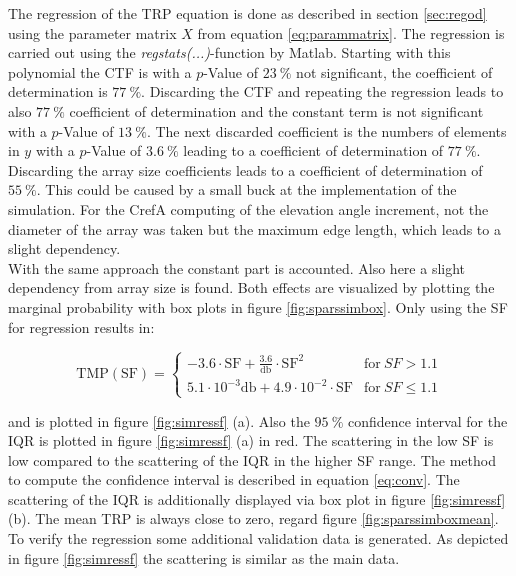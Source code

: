 The regression of the \ac{TRP} equation is done as described in section \ref{sec:regod} using the parameter matrix $X$ from equation \ref{eq:parammatrix}. The regression is carried out using the \textit{regstats(...)}-function by Matlab\texttrademark{}. Starting with this polynomial the \ac{CTF} is with a $p$-Value of $\SI{23}{\percent}$ not significant, the coefficient of determination is $\SI{77}{\percent}$. Discarding the \ac{CTF} and repeating the regression leads to also $\SI{77}{\percent}$ coefficient of determination and the constant term is not significant with a $p$-Value of $\SI{13}{\percent}$. The next discarded coefficient is the numbers of elements in $y$ with a  $p$-Value of $\SI{3.6}{\percent}$ leading to a coefficient of determination of $\SI{77}{\percent}$. Discarding the array size coefficients leads to a coefficient of determination of $\SI{55}{\percent}$. This could be caused by a small buck at the implementation of the simulation. For the \ac{CrefA} computing of the elevation angle increment, not the diameter of the array was taken but the maximum edge length, which leads to a slight dependency.\\
With the same approach the constant part is accounted. Also here a slight dependency from array size is found. Both effects are visualized by plotting the marginal probability with box plots in figure \ref{fig:sparssimbox}. Only using the \ac{SF} for regression results in:

\begin{equation}
\text{TMP}\left(\text{SF}\right)=\begin{cases} -3.6\cdot\text{SF}+\frac{3.6}{\si{\decibel}}\cdot\text{SF}^2 & \text{for}\ SF>1.1\\
5.1\cdot 10^{-3}\si{\decibel}+4.9\cdot 10^{-2}\cdot \text{SF} & \text{for}\ SF\le 1.1\end{cases}
\end{equation}

and is plotted in figure \ref{fig:simressf} (a). Also the $\SI{95}{\percent}$ confidence interval for the \ac{IQR} is plotted in figure \ref{fig:simressf} (a) in red. The scattering in the low \ac{SF} is low compared to the scattering of the \ac{IQR} in the higher \ac{SF} range. The method to compute the confidence interval is described in equation \ref{eq:conv}. The scattering of the \ac{IQR} is additionally displayed via box plot in figure \ref{fig:simressf} (b). The mean \ac{TRP} is always close to zero, regard figure \ref{fig:sparssimboxmean}. To verify the regression some additional validation data is generated. As depicted in figure \ref{fig:simressf} the scattering is similar as the main data.

